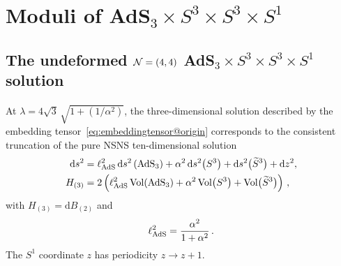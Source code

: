 \documentclass[a4paper, 11pt]{article}
\numberwithin{equation}{section}
\newcommand{\ts}[1]{\widetilde{#1}}
\newcommand{\SL}[1]{\mathrm{SL}( #1 )}
\newcommand{\En}[1]{E_{#1(#1)}}
\newcommand{\+}{\oplus}
\renewcommand{\d}{\ensuremath{\mathrm{d}}\xspace}
\newcommand{\EM}[1]{\textcolor{red}{#1}}
\begin{document}



\section{Moduli of \texorpdfstring{AdS$_3 \times S^3 \times S^3 \times S^1$}{AdS3xS3xS3xS1}} \label{s:Moduli}

\subsection{The undeformed ${\cal N}=(4,4)$ AdS$_3 \times S^3 \times S^3 \times S^1$ solution}
\paragraph{} At $\lambda=4\sqrt{3}\,\sqrt{1+(1/\alpha^{2})}$, the three-dimensional solution described by the embedding tensor~\eqref{eq:embeddingtensor@origin} corresponds to the consistent truncation of the pure NSNS ten-dimensional solution~\cite{deBoer:1999gea}
\begin{equation} \label{eq:AdS3}
	\begin{split}
		\d s^{2} &= \ell_{\rm AdS}^{2}\,\d s^{2}\left({\rm AdS}_{3}\right) + \alpha^{2}\,\d s^{2}\big(S^{3}\big)+\d s^{2}\big(\ts{S}^{3}\big)+\d z^{2},\\
		H_{(3)} &= 2\left(\ell_{\rm AdS}^{2}\,{\rm Vol}({\rm AdS_{3}})+\alpha^{2}\,{\rm Vol}\big(S^{3}\big)+{\rm Vol}\big(\ts{S}^{3}\big)\right)\,,
	\end{split}
\end{equation}
with $H_{(3)} = \d B_{(2)}$ and
\begin{equation}
	\ell_{\rm AdS}^{2} = \frac{\alpha^{2}}{1+\alpha^{2}}\,.
\end{equation}
The $S^{1}$ coordinate $z$ has periodicity $z\rightarrow z+1$.
\end{document}
